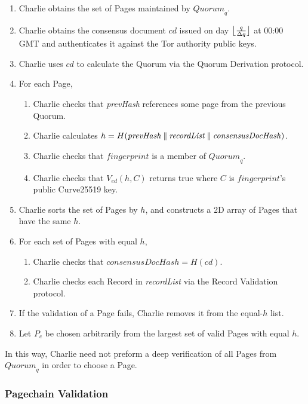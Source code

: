 \begin{enumerate}
	\item Charlie obtains the set of Pages maintained by $ \mathit{Quorum}_{q} $.
	\item Charlie obtains the consensus document $ \mathit{cd} $ issued on day $ \floor[\big]{\frac{q}{\Delta q}} $ at 00:00 GMT and authenticates it against the Tor authority public keys.
	\item Charlie uses $ \mathit{cd} $ to calculate the Quorum via the Quorum Derivation protocol.
	\item For each Page,
		\begin{enumerate}
			\item Charlie checks that \emph{prevHash} references some page from the previous Quorum.
			\item Charlie calculates $ h = H(\mathit{prevHash} \concat \mathit{recordList} \concat \mathit{consensusDocHash}) $.
			\item Charlie checks that $ \mathit{fingerprint} $ is a member of $ \mathit{Quorum}_{q} $.
			\item Charlie checks that $ V_{\mathit{ed}}(h, C) $ returns true where $ C $ is $ \mathit{fingerprint} $'s public Curve25519 key.
		\end{enumerate}
	\item Charlie sorts the set of Pages by $ h $, and constructs a 2D array of Pages that have the same $ h $.
	\item For each set of Pages with equal $ h $,
		\begin{enumerate}
			\item Charlie checks that $ \mathit{consensusDocHash} = H(\mathit{cd}) $.
			\item Charlie checks each Record in \emph{recordList} via the Record Validation protocol.
		\end{enumerate}
	\item If the validation of a Page fails, Charlie removes it from the equal-$ h $ list.
	\item Let $ P_{c} $ be chosen arbitrarily from the largest set of valid Pages with equal $ h $.
\end{enumerate}

In this way, Charlie need not preform a deep verification of all Pages from $ \mathit{Quorum}_{q} $ in order to choose a Page.

\subsubsection{Pagechain Validation}

